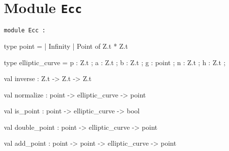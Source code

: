\documentclass[11pt]{article}
\begin{document}
\tableofcontents
\section{Module {\tt{Ecc}}}
\label{module:Ecc}


\ocamldocvspace{0.5cm}



\begin{ocamldoccode}
{\tt{module }}{\tt{Ecc}}{\tt{ : }}\end{ocamldoccode}
\label{module:Ecc.Ecc}

\begin{ocamldocsigend}


\label{type:Ecc.Ecc.point}\begin{ocamldoccode}
type point =
  | Infinity
  | Point of Z.t * Z.t
\end{ocamldoccode}


\label{type:Ecc.Ecc.elliptic-underscorecurve}\begin{ocamldoccode}
type elliptic_curve = {}
  p : Z.t ;
  a : Z.t ;
  b : Z.t ;
  g : point ;
  n : Z.t ;
  h : Z.t ;
{}
\end{ocamldoccode}


\label{val:Ecc.Ecc.inverse}\begin{ocamldoccode}
val inverse : Z.t -> Z.t -> Z.t
\end{ocamldoccode}


\label{val:Ecc.Ecc.normalize}\begin{ocamldoccode}
val normalize : point -> elliptic_curve -> point
\end{ocamldoccode}


\label{val:Ecc.Ecc.is-underscorepoint}\begin{ocamldoccode}
val is_point : point -> elliptic_curve -> bool
\end{ocamldoccode}


\label{val:Ecc.Ecc.double-underscorepoint}\begin{ocamldoccode}
val double_point : point -> elliptic_curve -> point
\end{ocamldoccode}


\label{val:Ecc.Ecc.add-underscorepoint}\begin{ocamldoccode}
val add_point : point -> point -> elliptic_curve -> point
\end{ocamldoccode}



\end{ocamldocsigend}
\end{document}
